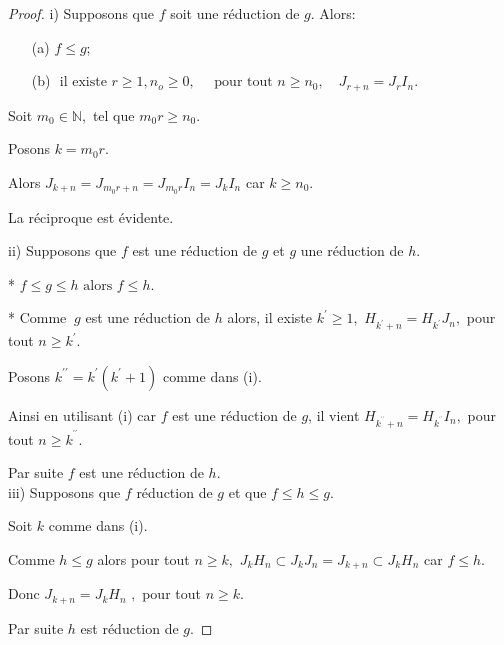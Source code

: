 \begin{proof}
	i) Supposons que $f$ soit une réduction de $g$. Alors:
	\begin{enumerate}
		\item[(a)] $f \leqslant g$;
		\item[(b)] $\text{ il existe } r \geqslant 1,n_o \geqslant 0 ,\quad \text{ pour tout } n \geqslant n_0,\quad J_{r+n}= J_r I_n $.
	\end{enumerate}
	Soit $m_{0}\in \mathbb{N},$ tel que $m_{0}r\geq n_{0}$.
	
	Posons $k=m_{0}r$.
	
	Alors $J_{k+n}=J_{m_{0}r+n}=J_{m_{0}r}I_{n}=J_{k}I_{n}$ car $k\geq n_{0}.$
	
	La réciproque est évidente.
	
	ii) Supposons que $f$ est une réduction de $g$ et $g$ une réduction
	de $h.$
	
	* $f\leq g\leq h\text{ alors } f\leq h$.
	
	* Comme $\ g$ est une réduction de $h$ alors, il existe $k^{\prime }\geq
	1,$ $H_{k^{\prime }+n}=H_{k^{\prime }}J_{n},$ pour tout $n\geq k^{\prime }.$
	
	Posons $k^{\prime \prime }=k^{\prime }(k^{\prime }+1)$ comme dans (i).
	
	Ainsi en utilisant (i) car $f$ est une réduction de $g$, il vient  $H_{k^{^{\prime \prime }}+n}=H_{k^{^{\prime \prime }}}I_{n},$ pour tout $n\geq k^{^{\prime \prime }}.$
	
	Par suite $f$ est une réduction de $h$. \\
	
	iii) Supposons que $f$ réduction de $g$ et que $f\leq h\leq g.$
	
	Soit $k$ comme dans (i).
	
	Comme $h\leq g$ alors pour tout $n\geq k,$ $J_{k}H_{n}\subset
	J_{k}J_{n}=J_{k+n}\subset J_{k}H_{n}$ car $f\leq h.$
	
	Donc $J_{k+n}=J_{k}H_{n}$ $,$ pour tout $n\geq k.$
	
	Par suite $h$ est réduction de $g.$
\end{proof}


